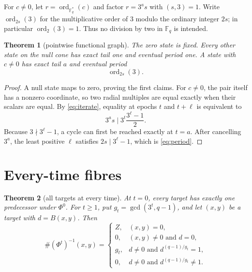 \documentclass[a4paper,10pt]{amsart}
\newtheorem{theorem}{Theorem}[section]
\theoremstyle{remark}
\newcommand{\Fq}{\mathbb F_q}
\newcommand{\ord}{\operatorname{ord}}
\newcommand{\1}{\mathbf 1}
\begin{document}
For $c\ne0$, let $r=\ord_{\Fq^*}(c)$ and factor
$r=3^a s$ with $(s,3)=1$.  Write $\ord_{2s}(3)$ for the multiplicative
order of $3$ modulo the ordinary integer $2s$; in particular
$\ord_2(3)=1$.  Thus no division by two in $\Fq$ is intended.

\begin{theorem}[pointwise functional graph]\label{thm:orbit}
The zero state is fixed.  Every other state on the null cone has exact tail
one and eventual period one.  A state with $c\ne0$ has exact tail $a$ and
eventual period
\begin{equation}\label{eq:period}
 \ord_{2s}(3).
\end{equation}
\end{theorem}

\begin{proof}
A null state maps to zero, proving the first claims.  For $c\ne0$, the pair
itself has a nonzero coordinate, so two radial multiples are equal exactly
when their scalars are equal.  By \eqref{eq:iterate}, equality at epochs
$t$ and $t+\ell$ is equivalent to
\begin{equation}\label{eq:divisibility}
 3^a s\mid 3^t\frac{3^\ell-1}{2}.
\end{equation}
Because $3\nmid 3^\ell-1$, a cycle can first be reached exactly at $t=a$.
After cancelling $3^a$, the least positive $\ell$ satisfies
$2s\mid3^\ell-1$, which is \eqref{eq:period}.
\end{proof}

\section{Every-time fibres}

\begin{theorem}[all targets at every time]\label{thm:fibres}
At $t=0$, every target has exactly one predecessor under $\Phi^0$.  For
$t\ge1$, put $g_t=\gcd(3^t,q-1)$, and let $(x,y)$ be a target with
$d=B(x,y)$.  Then
\begin{equation}\label{eq:fibres}
 \#(\Phi^t)^{-1}(x,y)=
 \begin{cases}
 Z,&(x,y)=0,\\
 0,&(x,y)\ne0\text{ and }d=0,\\
 g_t,&d\ne0\text{ and }d^{(q-1)/g_t}=1,\\
 0,&d\ne0\text{ and }d^{(q-1)/g_t}\ne1.
 \end{cases}
\end{equation}
\end{theorem}
\end{document}
